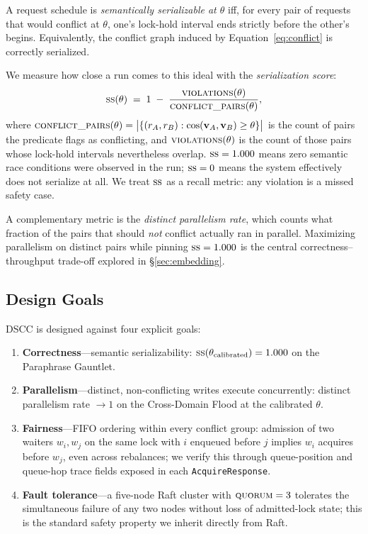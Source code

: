 \documentclass[sigconf]{acmart}
\begin{document}
A request schedule is \emph{semantically serializable at $\theta$} iff,
for every pair of requests that would conflict at $\theta$, one's
lock-hold interval ends strictly before the other's begins. Equivalently,
the conflict graph induced by Equation~\ref{eq:conflict} is correctly
serialized.

We measure how close a run comes to this ideal with the
\emph{serialization score}:
\begin{equation}
  \textsc{ss}(\theta)
  \;=\;1\;-\;
  \frac{\textsc{violations}(\theta)}{\textsc{conflict\_pairs}(\theta)},
  \label{eq:serscore}
\end{equation}
where
\(\textsc{conflict\_pairs}(\theta)=\bigl|\{(r_A,r_B):
\cos(\mathbf{v}_A,\mathbf{v}_B)\ge\theta\}\bigr|\) is the count of pairs
the predicate flags as conflicting, and \(\textsc{violations}(\theta)\) is
the count of those pairs whose lock-hold intervals nevertheless overlap.
\(\textsc{ss}=1.000\) means zero semantic race conditions were observed in
the run; \(\textsc{ss}=0\) means the system effectively does not
serialize at all. We treat \(\textsc{ss}\) as a recall metric: any
violation is a missed safety case.

A complementary metric is the \emph{distinct parallelism rate}, which
counts what fraction of the pairs that should \emph{not} conflict actually
ran in parallel. Maximizing parallelism on distinct pairs while pinning
\(\textsc{ss}=1.000\) is the central correctness--throughput trade-off
explored in \S\ref{sec:embedding}.

\subsection{Design Goals}
\label{sec:goals}

DSCC is designed against four explicit goals:

\begin{enumerate}
\item \textbf{Correctness}---semantic serializability:
\(\textsc{ss}(\theta_\textrm{calibrated})=1.000\) on the Paraphrase Gauntlet.

\item \textbf{Parallelism}---distinct, non-conflicting writes execute
concurrently: distinct parallelism rate $\to1$ on the Cross-Domain Flood at
the calibrated $\theta$.

\item \textbf{Fairness}---FIFO ordering within every conflict group:
admission of two waiters $w_i,w_j$ on the same lock with $i$ enqueued before
$j$ implies $w_i$ acquires before $w_j$, even across rebalances; we
verify this through queue-position and queue-hop trace fields exposed in
each \texttt{AcquireResponse}.

\item \textbf{Fault tolerance}---a five-node Raft cluster with
$\textsc{quorum}=3$ tolerates the simultaneous failure of any two nodes
without loss of admitted-lock state; this is the standard safety property
we inherit directly from Raft.
\end{enumerate}
\end{document}
